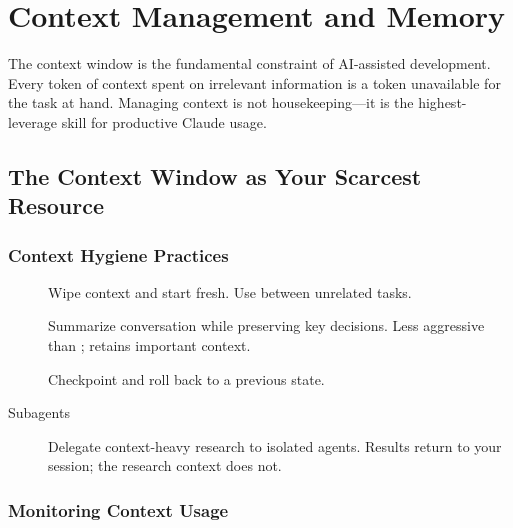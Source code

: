 \chapter{Context Management and Memory}
\label{ch:context}

The context window is the fundamental constraint of AI-assisted development.
Every token of context spent on irrelevant information is a token unavailable
for the task at hand. Managing context is not housekeeping---it is the
highest-leverage skill for productive Claude usage.

\section{The Context Window as Your Scarcest Resource}
\label{sec:context-scarcity}




\subsection{Context Hygiene Practices}

\begin{description}
  \item[] Wipe context and start fresh. Use between unrelated tasks.
  \item[] Summarize conversation while preserving key decisions.
    Less aggressive than ; retains important context.
  \item[] Checkpoint and roll back to a previous state.
  \item[Subagents] Delegate context-heavy research to isolated agents.
    Results return to your session; the research context does not.
\end{description}

\subsection{Monitoring Context Usage}


